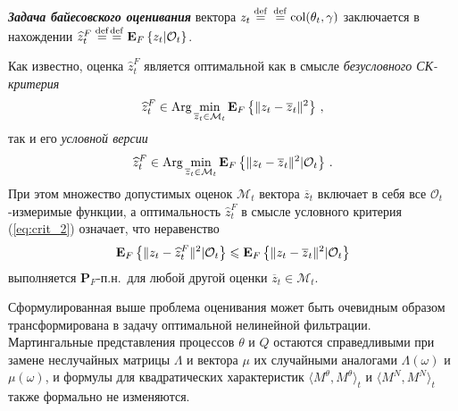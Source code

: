 \begin{multicols}{2}
 {\bfseries\textit{Задача байесовского оценивания}} вектора $z_t \stackrel{\mathrm {def}}{=}$\linebreak
$\stackrel{\mathrm {def}}{=} \mathop{\mathrm{col}}(\theta_t, \gamma)$ заключается в нахождении
 $\widehat{z}^F_t \stackrel{\mathrm {def}}{=} $\linebreak $\stackrel{\mathrm {def}}{=} \mathbf{E}_{ F }\left\{ \mathop{z_t | \mathcal{O}_t} \right\}$.

 Как известно, оценка $\widehat{z}^F_t$ является оптимальной как в смысле \emph{безусловного СК-критерия}
\begin{equation*}
 \displaystyle \widehat{z}^F_t \in \mathop{\mathrm {Arg}} \min_{\overline{z}_t \in
 \mathcal{M}_t}\mathbf{E}_{ F }\left\{ \mathop{\|z_t-\overline{z}_t\|^2} \right\}\,,
\end{equation*}
 так и его \emph{условной версии}
 \begin{equation}
 \displaystyle \widehat{z}^F_t \in \mathop{\mathrm {Arg}} \min_{\overline{z}_t \in
 \mathcal{M}_t}\mathbf{E}_{ F }\left\{ \mathop{\|z_t-\overline{z}_t\|^2|\mathcal{O}_t} \right\}\,.
 \label{eq:crit_2}
\end{equation}
 При этом множество допустимых оценок $\mathcal{M}_t$ вектора
 $\overline{z}_t$ включает в себя все $\mathcal{O}_t$-измеримые
 функции, а
 оптимальность $\widehat{z}^F_t$ в смысле условного критерия (\ref{eq:crit_2}) означает,
 что неравенство
$$\mathbf{E}_{ F }\left\{ \mathop{\|z_t-\widehat{z}^F_t\|^2|\mathcal{O}_t} \right\} \leqslant
\mathbf{E}_{ F }\left\{ \mathop{\|z_t-\overline{z}_t\|^2|\mathcal{O}_t} \right\}$$
 выполняется $\mathbf{P}_F$-п.н.\ для любой другой оценки $\overline{z}_t \in
 \mathcal{M}_t$.

 Сформулированная выше проблема оценивания может быть очевидным
 образом трансформирована в задачу оптимальной нелинейной
 фильтрации. Мартингальные представления процессов $\theta$ и $Q$
 остаются справедливыми при замене неслучайных матрицы $\Lambda$ и вектора $\mu$
 их случайными аналогами $\Lambda(\omega)$ и $\mu(\omega)$, и
 формулы для квадратических характеристик $\langle
 M^{\theta}, M^{\theta}\rangle _t$ и $\langle
 M^{N}, M^{N}\rangle _t$ также формально не изменяются.


\end{multicols}
